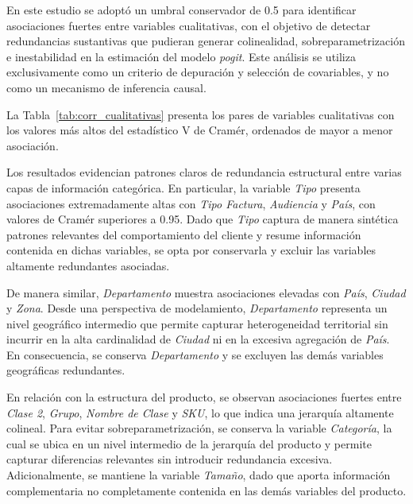         En este estudio se adoptó un umbral conservador de 0.5 para identificar asociaciones fuertes entre variables cualitativas, con el objetivo de detectar redundancias sustantivas que pudieran generar colinealidad, sobreparametrización e inestabilidad en la estimación del modelo \emph{pogit}. Este análisis se utiliza exclusivamente como un criterio de depuración y selección de covariables, y no como un mecanismo de inferencia causal.
        
        La Tabla~\ref{tab:corr_cualitativas} presenta los pares de variables cualitativas con los valores más altos del estadístico V de Cramér, ordenados de mayor a menor asociación.

        Los resultados evidencian patrones claros de redundancia estructural entre varias capas de información categórica. En particular, la variable \textit{Tipo} presenta asociaciones extremadamente altas con \textit{Tipo Factura}, \textit{Audiencia} y \textit{País}, con valores de Cramér superiores a 0.95. Dado que \textit{Tipo} captura de manera sintética patrones relevantes del comportamiento del cliente y resume información contenida en dichas variables, se opta por conservarla y excluir las variables altamente redundantes asociadas.

        De manera similar, \textit{Departamento} muestra asociaciones elevadas con \textit{País}, \textit{Ciudad} y \textit{Zona}. Desde una perspectiva de modelamiento, \textit{Departamento} representa un nivel geográfico intermedio que permite capturar heterogeneidad territorial sin incurrir en la alta cardinalidad de \textit{Ciudad} ni en la excesiva agregación de \textit{País}. En consecuencia, se conserva \textit{Departamento} y se excluyen las demás variables geográficas redundantes.
        
        En relación con la estructura del producto, se observan asociaciones fuertes entre \textit{Clase 2}, \textit{Grupo}, \textit{Nombre de Clase} y \textit{SKU}, lo que indica una jerarquía altamente colineal. Para evitar sobreparametrización, se conserva la variable \textit{Categoría}, la cual se ubica en un nivel intermedio de la jerarquía del producto y permite capturar diferencias relevantes sin introducir redundancia excesiva. Adicionalmente, se mantiene la variable \textit{Tamaño}, dado que aporta información complementaria no completamente contenida en las demás variables del producto.
        
